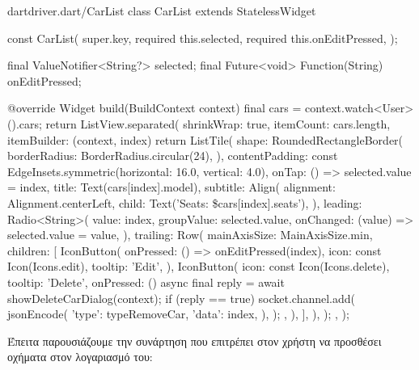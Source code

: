 \documentclass[../thesis.tex]{subfiles}
\begin{document}
\begin{codeblock}{dart}{driver.dart/CarList}
  class CarList extends StatelessWidget {
  const CarList({
    super.key,
    required this.selected,
    required this.onEditPressed,
  });

  final ValueNotifier<String?> selected;
  final Future<void> Function(String) onEditPressed;

  @override
  Widget build(BuildContext context) {
    final cars = context.watch<User>().cars;
    return ListView.separated(
      shrinkWrap: true,
      itemCount: cars.length,
      itemBuilder: (context, index) {
        return ListTile(
          shape: RoundedRectangleBorder(
            borderRadius: BorderRadius.circular(24),
          ),
          contentPadding:
              const EdgeInsets.symmetric(horizontal: 16.0, vertical: 4.0),
          onTap: () => selected.value = index,
          title: Text(cars[index].model),
          subtitle: Align(
            alignment: Alignment.centerLeft,
            child: Text('Seats: \${cars[index].seats}'),
          ),
          leading: Radio<String>(
            value: index,
            groupValue: selected.value,
            onChanged: (value) => selected.value = value,
          ),
          trailing: Row(
            mainAxisSize: MainAxisSize.min,
            children: [
              IconButton(
                onPressed: () => onEditPressed(index),
                icon: const Icon(Icons.edit),
                tooltip: 'Edit',
              ),
              IconButton(
                icon: const Icon(Icons.delete),
                tooltip: 'Delete',
                onPressed: () async {
                  final reply = await showDeleteCarDialog(context);
                  if (reply == true) {
                    socket.channel.add(
                      jsonEncode({
                        'type': typeRemoveCar,
                        'data': index,
                      }),
                    );
                  }
                },
              ),
            ],
          ),
        );
      },
    );
  }
}
\end{codeblock}

Έπειτα παρουσιάζουμε την συνάρτηση που επιτρέπει στον χρήστη να προσθέσει οχήματα στον λογαριασμό του:
\end{document}
